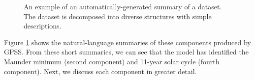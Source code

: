 \documentclass{article}
\begin{document}
\begin{figure}[h]
\centering
{}
\caption{
An example of an automatically-generated summary of a dataset.  The dataset is decomposed into diverse structures with simple descriptions.}
\label{fig:exec}
\end{figure}
Figure \ref{fig:exec} shows the natural-language summaries of these components produced by GPSS.
%
%
From these short summaries, we can see that the model has identified the Maunder minimum (second component) and 11-year solar cycle (fourth component).
Next, we discuss each component in greater detail.
\end{document}
